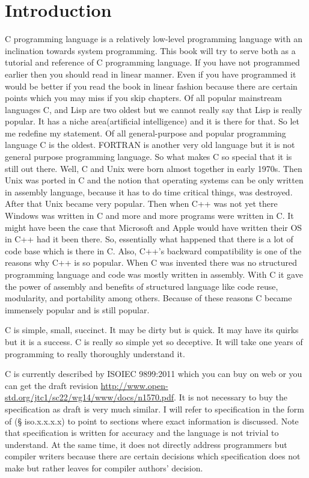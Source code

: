 \chapter{Introduction}
C programming language is a relatively low-level programming language with an
inclination towards system programming. This book will try to serve both as a
tutorial and reference of C programming language. If you have not programmed
earlier then you should read in linear manner. Even if you have programmed it
would be better if you read the book in linear fashion because there are
certain points which you may miss if you skip chapters. Of all popular
mainstream languages C, and Lisp are two oldest but we cannot really say that
Lisp is really popular. It has a niche area(artificial intelligence) and it is
there for that. So let me redefine my statement. Of all general-purpose and
popular programming language C is the oldest. FORTRAN is another very old
language but it is not general purpose programming language. So what makes C so
special that it is still out there. Well, C and Unix were born almost together
in early 1970s. Then Unix was ported in C and the notion that operating systems
can be only written in assembly language, because it has to do time critical
things, was destroyed. After that Unix became very popular. Then when C++ was
not yet there Windows was written in C and more and more programs were written
in C. It might have been the case that Microsoft and Apple would have written
their OS in C++ had it been there. So, essentially what happened that there is
a lot of code base which is there in C. Also, C++'s backward compatibility is
one of the reasons why C++ is so popular. When C was invented there was no
structured programming language and code was mostly written in assembly. With C
it gave the power of assembly and benefits of structured language like code
reuse, modularity, and portability among others. Because of these reasons C
became immensely popular and is still popular. 

C is simple, small, succinct. It may be dirty but is quick. It may have its
quirks but it is a success. C is really so simple yet so deceptive. It will
take one years of programming to really thoroughly understand it.

C is currently described by ISO\/IEC 9899:2011 which you can buy on web or you
can get the draft revision
\url{http://www.open-std.org/jtc1/sc22/wg14/www/docs/n1570.pdf}. It
is not necessary to buy the specification as draft is very much similar. I will
refer to specification in the form of (§ iso.x.x.x.x) to point to sections
where exact information is discussed. Note that specification is written for
accuracy and the language is not trivial to understand. At the same time, it
does not directly address programmers but compiler writers because there are
certain decisions which specification does not make but rather leaves for
compiler authors' decision.

